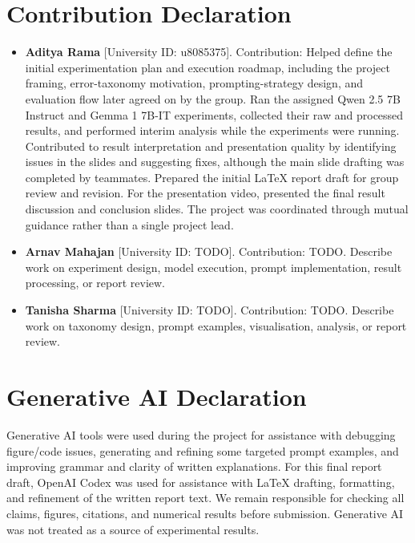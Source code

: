 \documentclass[10pt,twocolumn]{article}
\begin{document}
\section*{Contribution Declaration}

\begin{itemize}
     \item \textbf{Aditya Rama} [University ID: u8085375]. Contribution: Helped define the initial experimentation plan and execution roadmap, including the project framing, error-taxonomy motivation, prompting-strategy design, and evaluation flow later agreed on by the group. Ran the assigned Qwen 2.5 7B Instruct and Gemma 1 7B-IT experiments, collected their raw and processed results, and performed interim analysis while the experiments were running. Contributed to result interpretation and presentation quality by identifying issues in the slides and suggesting fixes, although the main slide drafting was completed by teammates. Prepared the initial LaTeX report draft for group review and revision. For the presentation video, presented the final result discussion and conclusion slides. The project was coordinated through mutual guidance rather than a single project lead.
    \item \textbf{Arnav Mahajan} [University ID: TODO]. Contribution: TODO. Describe work on experiment design, model execution, prompt implementation, result processing, or report review.
    \item \textbf{Tanisha Sharma} [University ID: TODO]. Contribution: TODO. Describe work on taxonomy design, prompt examples, visualisation, analysis, or report review.
\end{itemize}

\section*{Generative AI Declaration}
Generative AI tools were used during the project for assistance with debugging figure/code issues, generating and refining some targeted prompt examples, and improving grammar and clarity of written explanations. For this final report draft, OpenAI Codex was used for assistance with LaTeX drafting, formatting, and refinement of the written report text. We remain responsible for checking all claims, figures, citations, and numerical results before submission. Generative AI was not treated as a source of experimental results.
\end{document}
